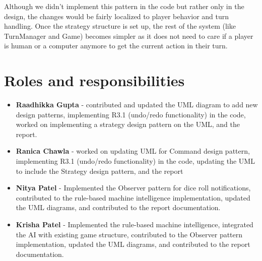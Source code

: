 Although we didn't implement this pattern in the code but rather only in the design, the changes would be fairly localized to player behavior and turn handling. Once the strategy structure is set up, the rest of the system (like TurnManager and Game) becomes simpler as it does not need to care if a player is human or a computer anymore to get the current action in their turn.

\section{Roles and responsibilities}

\begin{itemize}
    \item {\textbf{Raadhikka Gupta} - contributed and updated the UML diagram to add new design patterns, implementing R3.1 (undo/redo functionality) in the code, worked on implementing a strategy design pattern on the UML, and the report.}
    \item {\textbf{Ranica Chawla} - worked on updating UML for Command design pattern, implementing R3.1 (undo/redo functionality) in the code, updating the UML to include the Strategy design pattern, and the report}
	\item {\textbf{Nitya Patel} - Implemented the Observer pattern for dice roll notifications, contributed to the rule-based machine intelligence implementation, updated the UML diagrams, and contributed to the report documentation. } 
	\item {\textbf{Krisha Patel} - Implemented the rule-based machine intelligence, integrated the AI with existing game structure, contributed to the Observer pattern implementation, updated the UML diagrams, and contributed to the report documentation.}
\end{itemize}
